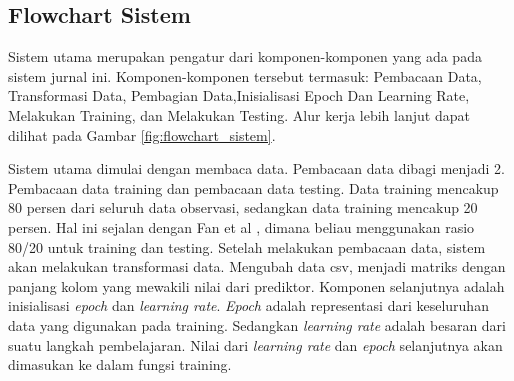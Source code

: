 
\subsection{Flowchart Sistem}

Sistem utama merupakan pengatur dari komponen-komponen yang ada pada sistem jurnal ini. Komponen-komponen tersebut termasuk: Pembacaan Data, Transformasi Data, Pembagian Data,Inisialisasi Epoch Dan Learning Rate, Melakukan Training, dan Melakukan Testing. Alur kerja lebih lanjut dapat dilihat pada Gambar \ref{fig:flowchart_sistem}.

Sistem utama dimulai dengan membaca data. Pembacaan data dibagi menjadi 2. Pembacaan data training dan pembacaan data testing. Data training mencakup 80 persen dari seluruh data observasi, sedangkan data training mencakup 20 persen. Hal ini sejalan dengan Fan et al \cite{fan2008liblinear}, dimana beliau menggunakan rasio 80/20 untuk training dan testing. Setelah melakukan pembacaan data, sistem akan melakukan transformasi data. Mengubah data csv, menjadi matriks dengan panjang kolom yang mewakili nilai dari prediktor. Komponen selanjutnya adalah inisialisasi \emph{epoch} dan \emph{learning rate}. \emph{Epoch} adalah representasi dari keseluruhan data yang digunakan pada training. Sedangkan \emph{learning rate} adalah besaran dari suatu langkah pembelajaran. Nilai dari \emph{learning rate} dan \emph{epoch} selanjutnya akan dimasukan ke dalam fungsi training.

